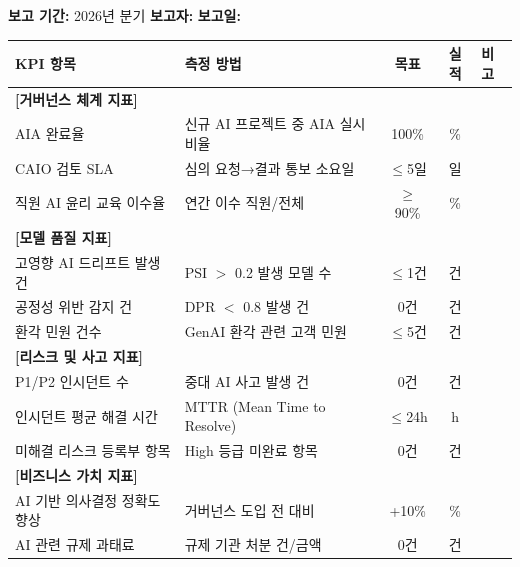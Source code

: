 \begin{tcolorbox}[colback=green!5, colframe=green!60, title={[Template C.9] AI 거버넌스 KPI 분기 대시보드}]
\textbf{보고 기간:} 2026년 \hspace{0.5cm}분기 \quad \textbf{보고자:} \underline{\hspace{2cm}} \quad \textbf{보고일:} \underline{\hspace{2cm}}

\begin{center}
\begin{tabularx}{\textwidth}{|p{3cm}|p{2.5cm}|c|c|p{3cm}|}
\hline
\textbf{KPI 항목} & \textbf{측정 방법} & \textbf{목표} & \textbf{실적} & \textbf{비고} \\ \hline
\multicolumn{5}{|l|}{\textbf{[거버넌스 체계 지표]}} \\ \hline
AIA 완료율 & 신규 AI 프로젝트 중 AIA 실시 비율 & 100\% & \hspace{0.5cm}\% & \\ \hline
CAIO 검토 SLA & 심의 요청→결과 통보 소요일 & $\leq$5일 & \hspace{0.5cm}일 & \\ \hline
직원 AI 윤리 교육 이수율 & 연간 이수 직원/전체 & $\geq$90\% & \hspace{0.5cm}\% & \\ \hline
\multicolumn{5}{|l|}{\textbf{[모델 품질 지표]}} \\ \hline
고영향 AI 드리프트 발생 건 & PSI $>$ 0.2 발생 모델 수 & $\leq$1건 & \hspace{0.5cm}건 & \\ \hline
공정성 위반 감지 건 & DPR $<$ 0.8 발생 건 & 0건 & \hspace{0.5cm}건 & \\ \hline
환각 민원 건수 & GenAI 환각 관련 고객 민원 & $\leq$5건 & \hspace{0.5cm}건 & \\ \hline
\multicolumn{5}{|l|}{\textbf{[리스크 및 사고 지표]}} \\ \hline
P1/P2 인시던트 수 & 중대 AI 사고 발생 건 & 0건 & \hspace{0.5cm}건 & \\ \hline
인시던트 평균 해결 시간 & MTTR (Mean Time to Resolve) & $\leq$24h & \hspace{0.5cm}h & \\ \hline
미해결 리스크 등록부 항목 & High 등급 미완료 항목 & 0건 & \hspace{0.5cm}건 & \\ \hline
\multicolumn{5}{|l|}{\textbf{[비즈니스 가치 지표]}} \\ \hline
AI 기반 의사결정 정확도 향상 & 거버넌스 도입 전 대비 & +10\% & \hspace{0.5cm}\% & \\ \hline
AI 관련 규제 과태료 & 규제 기관 처분 건/금액 & 0건 & \hspace{0.5cm}건 & \\ \hline
\end{tabularx}
\end{center}


\end{tcolorbox}
